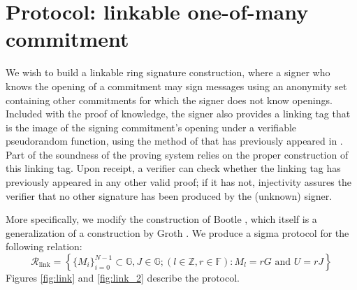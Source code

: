 \documentclass{article}
\newcommand{\G}{\mathbb{G}}
\newcommand{\F}{\mathbb{F}}
\theoremstyle{definition}
\begin{document}
\section{Protocol: linkable one-of-many commitment}
We wish to build a linkable ring signature construction, where a signer who knows the opening of a commitment may sign messages using an anonymity set containing other commitments for which the signer does not know openings.
Included with the proof of knowledge, the signer also provides a linking tag that is the image of the signing commitment's opening under a verifiable pseudorandom function, using the method of \cite{dodis} that has previously appeared in \cite{omniring,rct3}.
Part of the soundness of the proving system relies on the proper construction of this linking tag.
Upon receipt, a verifier can check whether the linking tag has previously appeared in any other valid proof; if it has not, injectivity assures the verifier that no other signature has been produced by the (unknown) signer.

More specifically, we modify the construction of Bootle \cite{bootle}, which itself is a generalization of a construction by Groth \cite{groth}.
We produce a sigma protocol for the following relation:
$$\mathcal{R}_{\text{link}} = \left\{ \{M_i\}_{i=0}^{N-1} \subset \G, J \in \G ; (l \in \mathbb{Z},r \in \F) : M_l = rG \text{ and } U = rJ \right\}$$
Figures \ref{fig:link} and \ref{fig:link_2} describe the protocol.
\end{document}

